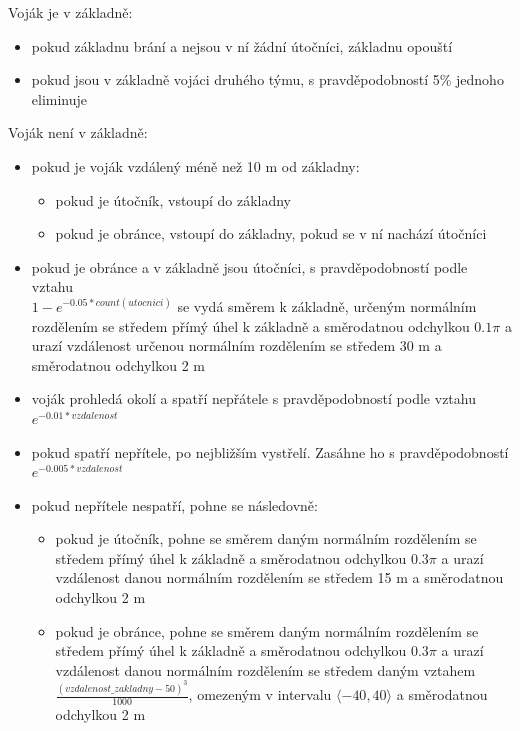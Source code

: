 \documentclass[a4paper, 11pt]{article}
\begin{document}
    Voják je v základně:
    \begin{itemize}
        \item pokud základnu brání a nejsou v ní žádní útočníci, základnu opouští
        \item pokud jsou v základně vojáci druhého týmu, s pravděpodobností 5\% jednoho eliminuje
    \end{itemize}
   Voják není v základně:
    \begin{itemize}
        \item pokud je voják vzdálený méně než 10 m od základny:
        \begin{itemize}
            \item pokud je útočník, vstoupí do základny
            \item pokud je obránce, vstoupí do základny, pokud se v ní nachází útočníci
        \end{itemize}
        \item pokud je obránce a v základně jsou útočníci, s pravděpodobností podle vztahu \\ $1 - e^{-0.05 * count(utocnici)}$ se vydá směrem k základně, určeným normálním rozdělením se středem přímý úhel k základně a směrodatnou odchylkou $0.1\pi$ a urazí vzdálenost určenou normálním rozdělením se středem 30 m a směrodatnou odchylkou 2 m
        \item voják prohledá okolí a spatří nepřátele s pravděpodobností podle vztahu $e^{-0.01 * vzdalenost}$
        \item pokud spatří nepřítele, po nejbližším vystřelí. Zasáhne ho s pravděpodobností \\ $e^{-0.005 * vzdalenost}$
        \item pokud nepřítele nespatří, pohne se následovně:
        \begin{itemize}
            \item pokud je útočník, pohne se směrem daným normálním rozdělením se středem přímý úhel k základně a směrodatnou odchylkou $0.3\pi$ a urazí vzdálenost danou normálním rozdělením se středem 15 m a směrodatnou odchylkou 2 m
            \item pokud je obránce, pohne se směrem daným normálním rozdělením se středem přímý úhel k základně a směrodatnou odchylkou $0.3\pi$ a urazí vzdálenost danou normálním rozdělením se středem daným vztahem $\frac{(vzdalenost\_zakladny - 50)^3}{1000}$, omezeným v intervalu $\langle -40, 40 \rangle$ a směrodatnou odchylkou 2 m
        \end{itemize}
    \end{itemize}
\end{document}
